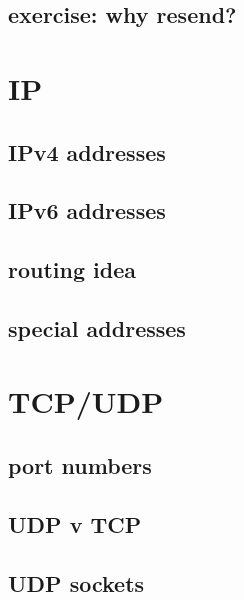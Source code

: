 \subsection{exercise: why resend?}


\section{IP}



\subsection{IPv4 addresses}


\subsection{IPv6 addresses}


\subsection{routing idea}


\subsection{special addresses}


\section{TCP/UDP}

\subsection{port numbers}


\subsection{UDP v TCP}


\subsection{UDP sockets}


